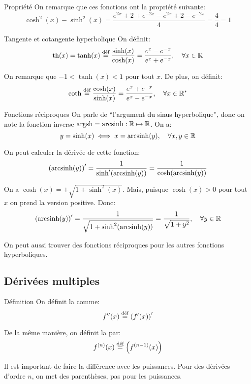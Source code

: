 \documentclass[a4paper]{article}
\begin{document}
\begin{parag}{Propriété}
    On remarque que ces fonctions ont la propriété suivante: 
    \[\cosh^2\left(x\right) - \sinh^2\left(x\right) = \frac{e^{2x} + 2 + e^{-2x} - e^{2x} + 2 - e^{-2x}}{4} = \frac{4}{4} = 1\]
    
\end{parag}


\begin{parag}{Tangente et cotangente hyperbolique}
    On définit: 
    \[\badth\left(x\right) = \tanh\left(x\right) \over{=}{déf} \frac{\sinh\left(x\right)}{\cosh\left(x\right)} = \frac{e^{x} - e^{-x}}{e^x + e^{-x}}, \mathspace \forall x \in \mathbb{R}\]
    
    On remarque que $-1 < \tanh\left(x\right) < 1$ pour tout $x$. De plus, on définit: 
    \[\coth \over{=}{déf} \frac{\cosh\left(x\right)}{\sinh\left(x\right)} = \frac{e^x + e^{-x}}{e^{x} - e^{-x}}, \mathspace \forall x \in \mathbb{R}^*\]
\end{parag}

\begin{parag}{Fonctions réciproques}
    On parle de ``l'argument du sinus hyperbolique'', donc on note la fonction inverse $\operatorname{argsh} = \operatorname{arcsinh} : \mathbb{R} \mapsto \mathbb{R}$. On a: 
    \[y = \sinh\left(x\right) \iff x = \arcsinh\left(y\right), \mathspace \forall x, y \in \mathbb{R}\]

    On peut calculer la dérivée de cette fonction: 
    \[\left(\arcsinh\left(y\right)\right)' = \frac{1}{\sinh'\left(\arcsinh\left(y\right)\right)} = \frac{1}{\cosh\left(\arcsinh\left(y\right)\right)}\]
    
    On a $\cosh\left(x\right) = \pm \sqrt{1 + \sinh^2\left(x\right)}$. Mais, puisque $\cosh\left(x\right) > 0$ pour tout $x$ on prend la version positive. Donc:
    \[\left(\arcsinh\left(y\right)\right)' = \frac{1}{\sqrt{1 + \sinh^2\left(\arcsinh\left(y\right)\right)}} = \frac{1}{\sqrt{1 + y^2}}, \mathspace \forall y \in \mathbb{R}\]

    On peut aussi trouver des fonctions réciproques pour les autres fonctions hyperboliques.
\end{parag}

\subsection{Dérivées multiples}
\begin{parag}{Définition}
    On définit la  comme: 
    \[f''\left(x\right) \over{=}{déf} \left(f'\left(x\right)\right)'\]
    
    De la même manière, on définit la  par: 
    \[f^{\left(n\right)}\left(x\right) \over{=}{déf} \left(f^{\left(n-1\right)}\left(x\right)\right)\]
    
    Il est important de faire la différence avec les puissances. Pour des dérivées d'ordre $n$, on met des parenthèses, pas pour les puissances.
\end{parag}
\end{document}
